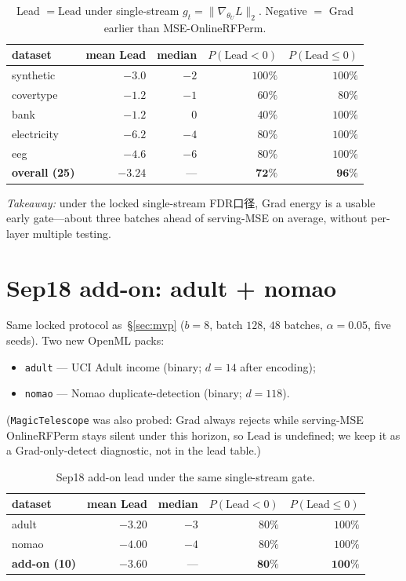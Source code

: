 \documentclass[11pt]{article}
\newcommand{\Lead}{\mathrm{Lead}}
\newcommand{\gradU}{\nabla_{\theta_U}}
\begin{document}
\begin{table}[h]
\centering
\caption{Lead $=\Lead$ under single-stream $g_t=\|\gradU L\|_2$.
Negative $=$ Grad earlier than MSE-OnlineRFPerm.}
\label{tab:mvp}
\begin{tabular}{lrrrr}
\toprule
dataset & mean Lead & median & $P(\Lead<0)$ & $P(\Lead\le 0)$ \\
\midrule
synthetic   & $-3.0$ & $-2$ & $100\%$ & $100\%$ \\
covertype   & $-1.2$ & $-1$ & $60\%$  & $80\%$ \\
bank        & $-1.2$ & $0$  & $40\%$  & $100\%$ \\
electricity & $-6.2$ & $-4$ & $80\%$  & $100\%$ \\
eeg         & $-4.6$ & $-6$ & $80\%$  & $100\%$ \\
\midrule
\textbf{overall (25)} & $\mathbf{-3.24}$ & --- & $\mathbf{72\%}$ & $\mathbf{96\%}$ \\
\bottomrule
\end{tabular}
\end{table}

\noindent\textit{Takeaway:} under the locked single-stream FDR口径,
Grad energy is a usable early gate---about three batches ahead of
serving-MSE on average, without per-layer multiple testing.

\section{Sep18 add-on: adult + nomao}
\label{sec:sep18}

Same locked protocol as~\S\ref{sec:mvp}
($b=8$, batch $128$, $48$ batches, $\alpha=0.05$, five seeds).
Two new OpenML packs:
\begin{itemize}[leftmargin=*,itemsep=0.2em]
  \item \texttt{adult} --- UCI Adult income (binary; $d{=}14$ after encoding);
  \item \texttt{nomao} --- Nomao duplicate-detection (binary; $d{=}118$).
\end{itemize}
(\texttt{MagicTelescope} was also probed: Grad always rejects while
serving-MSE OnlineRFPerm stays silent under this horizon, so
$\Lead$ is undefined; we keep it as a Grad-only-detect diagnostic,
not in the lead table.)

\begin{table}[h]
\centering
\caption{Sep18 add-on lead under the same single-stream gate.}
\label{tab:sep18}
\begin{tabular}{lrrrr}
\toprule
dataset & mean Lead & median & $P(\Lead<0)$ & $P(\Lead\le 0)$ \\
\midrule
adult & $-3.20$ & $-3$ & $80\%$ & $100\%$ \\
nomao & $-4.00$ & $-4$ & $80\%$ & $100\%$ \\
\midrule
\textbf{add-on (10)} & $\mathbf{-3.60}$ & --- & $\mathbf{80\%}$ & $\mathbf{100\%}$ \\
\bottomrule
\end{tabular}
\end{table}
\end{document}
